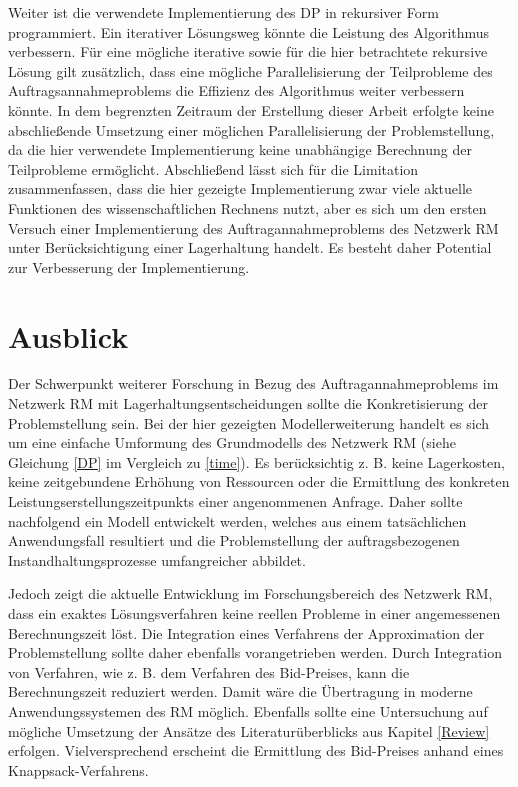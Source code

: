 Weiter ist die verwendete Implementierung des DP in rekursiver Form programmiert. Ein iterativer Lösungsweg könnte die Leistung des Algorithmus verbessern. Für eine mögliche iterative sowie für die hier betrachtete rekursive Lösung gilt zusätzlich, dass eine mögliche Parallelisierung der Teilprobleme des Auftragsannahmeproblems die Effizienz des Algorithmus weiter verbessern könnte. In dem begrenzten Zeitraum der Erstellung dieser Arbeit erfolgte keine abschließende Umsetzung einer möglichen Parallelisierung der Problemstellung, da die hier verwendete Implementierung keine unabhängige Berechnung der Teilprobleme ermöglicht. Abschließend lässt sich für die Limitation zusammenfassen, dass die hier gezeigte Implementierung zwar viele aktuelle Funktionen des wissenschaftlichen Rechnens nutzt, aber es sich um den ersten Versuch einer Implementierung des Auftragannahmeproblems des Netzwerk RM unter Berücksichtigung einer Lagerhaltung handelt. Es besteht daher Potential zur Verbesserung der Implementierung.

\section*{Ausblick}

Der Schwerpunkt weiterer Forschung in Bezug des Auftragannahmeproblems im Netzwerk RM mit Lagerhaltungsentscheidungen sollte die Konkretisierung der Problemstellung sein. Bei der hier gezeigten Modellerweiterung handelt es sich um eine einfache Umformung des Grundmodells des Netzwerk RM (siehe Gleichung \eqref{DP} im Vergleich zu \eqref{time}). Es berücksichtig z. B. keine Lagerkosten, keine zeitgebundene Erhöhung von Ressourcen oder die Ermittlung des konkreten Leistungserstellungszeitpunkts einer angenommenen Anfrage. Daher sollte nachfolgend ein Modell entwickelt werden, welches aus einem tatsächlichen Anwendungsfall resultiert und die Problemstellung der auftragsbezogenen Instandhaltungsprozesse umfangreicher abbildet.

Jedoch zeigt die aktuelle Entwicklung im Forschungsbereich des Netzwerk RM, dass ein exaktes Lösungsverfahren keine reellen Probleme in einer angemessenen Berechnungszeit löst. Die Integration eines Verfahrens der Approximation der Problemstellung sollte daher ebenfalls vorangetrieben werden. Durch Integration von Verfahren, wie z. B. dem Verfahren des Bid-Preises, kann die Berechnungszeit reduziert werden. Damit wäre die Übertragung in moderne Anwendungssystemen des RM möglich. Ebenfalls sollte eine Untersuchung auf mögliche Umsetzung der Ansätze des Literaturüberblicks aus Kapitel \ref{Review} erfolgen. Vielversprechend erscheint die Ermittlung des Bid-Preises anhand eines Knappsack-Verfahrens.




